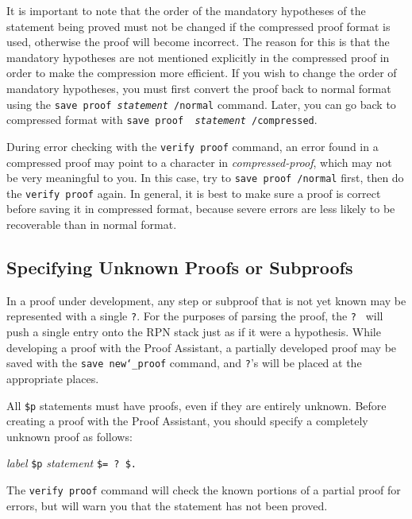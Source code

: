 It is important to note that the order of the mandatory hypotheses of
the statement being proved must not be changed if the compressed proof
format is used, otherwise the proof will become incorrect.  The reason
for this is that the mandatory hypotheses are not mentioned explicitly
in the compressed proof in order to make the compression more efficient.
If you wish to change the order of mandatory hypotheses, you must first
convert the proof back to normal format using the \texttt{save proof
{\em statement} /normal} command.
Later, you can go back to compressed format with \texttt{save proof {\em
statement} /compressed}.

During error checking with the \texttt{verify proof} command, an error
found in a compressed proof may point to a character in {\em
compressed-proof}, which may not be very meaningful to you.  In this
case, try to \texttt{save proof /normal} first, then do the
\texttt{verify proof} again.  In general, it is best to make sure a
proof is correct before saving it in compressed format, because severe
errors are less likely to be recoverable than in normal format.

\subsection{Specifying Unknown Proofs or Subproofs}\label{unknown}

In a proof under development, any step or subproof that is not yet known
may be represented with a single \texttt{?}.  For the purposes of
parsing the proof, the \texttt{?}\ \index{\texttt{]}@\texttt{?}\ inside
proofs} will push a single entry onto the RPN stack just as if it were a
hypothesis.  While developing a proof with the Proof
Assistant, a partially developed proof may be
saved with the \texttt{save new{\char`\_}proof} command, and \texttt{?}'s will be placed at
the appropriate places.

All \texttt{\$p} statements must have
proofs, even if they are entirely unknown.  Before creating a proof with
the Proof Assistant, you should specify a completely unknown proof as
follows:
\begin{center}
  {\em label} \texttt{\$p} {\em statement} \texttt{\$= ?\ \$.}
\end{center}
\index{\texttt{]}@\texttt{?}\ inside proofs}

The \texttt{verify proof} command
will check the known portions of a partial proof for errors, but will
warn you that the statement has not been proved.

